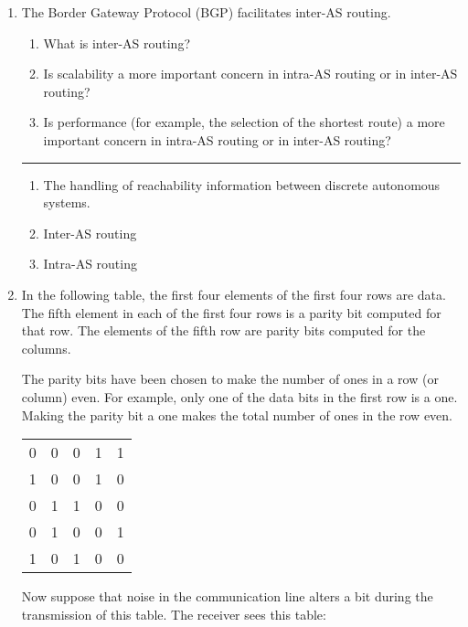 \documentclass[twoside]{article}
\newenvironment{answer}
  {\vspace*{0.2cm} \rule{12cm}{0.04cm} \vspace*{0.2cm}}
  {\vspace*{0.2cm}}
\begin{document}
\begin{enumerate}
\begin{answer}
    \end{answer}

  \item The Border Gateway Protocol (BGP) facilitates inter-AS routing.
  \begin{enumerate}
    \item What is inter-AS routing?
    \item Is scalability a more important concern in intra-AS routing
      or in inter-AS routing?
    \item Is performance (for example, the selection of the shortest
      route) a more important concern in intra-AS routing or
      in inter-AS routing?
    \end{enumerate}

  \begin{answer}

  \begin{enumerate}
    \item The handling of reachability information between discrete autonomous systems.
    \item Inter-AS routing
    \item Intra-AS routing
    \end{enumerate}

    \end{answer}

  \item In the following table, the first four elements of the
    first four rows are data. The fifth element in each of the 
    first four rows is a parity bit computed for that row.
    The elements of the fifth row are parity bits computed
    for the columns.

    The parity bits have been chosen to make the number of
    ones in a row (or column) even.
    For example, only one of the data bits in the first row
    is a one. Making the parity bit a one makes the total
    number of ones in the row even.

  \begin{tabular}{llll|l}
    0 & 0 & 0 & 1 & 1 \\
    1 & 0 & 0 & 1 & 0 \\
    0 & 1 & 1 & 0 & 0 \\
    0 & 1 & 0 & 0 & 1 \\ \hline
    1 & 0 & 1 & 0 & 0
    \end{tabular}

    Now suppose that noise in the communication line
    alters a bit during the transmission of this table.
    The receiver sees this table:


\end{enumerate}
\end{document}
